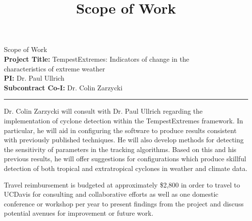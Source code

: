 \documentclass[11pt]{article}
\begin{document}
\title{Scope of Work}
\date{}


\begin{center}
\Large Scope of Work \\ [0.5cm]

\large \textbf{Project Title:} TempestExtremes: Indicators of change in the \\ characteristics of extreme weather \\ [0.5cm]

\large \textbf{PI:} Dr. Paul Ullrich \\
\large \textbf{Subcontract Co-I:} Dr. Colin Zarzycki \\[0.5cm]

\hrule

\end{center}

Dr. Colin Zarzycki will consult with Dr. Paul Ullrich regarding the implementation of cyclone detection within the TempestExtremes framework. In particular, he will aid in configuring the software to produce results consistent with previously published techniques. He will also develop methods for detecting the sensitivity of parameters in the tracking algorithms. Based on this and his previous results, he will offer suggestions for configurations which produce skillful detection of both tropical and extratropical cyclones in weather and climate data.

Travel reimbursement is budgeted at approximately \$2,800 in order to travel to UCDavis for consulting and collaborative efforts as well as one domestic conference or workshop per year to present findings from the project and discuss potential avenues for improvement or future work.

\end{document}
